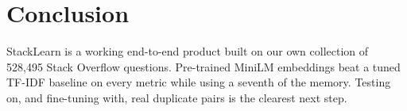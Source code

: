 \section{Conclusion}

StackLearn is a working end-to-end product built on our own collection of 528,495 Stack Overflow
questions. Pre-trained MiniLM embeddings beat a tuned TF-IDF baseline on every metric while using a
seventh of the memory. Testing on, and fine-tuning with, real duplicate pairs is the clearest next step.
